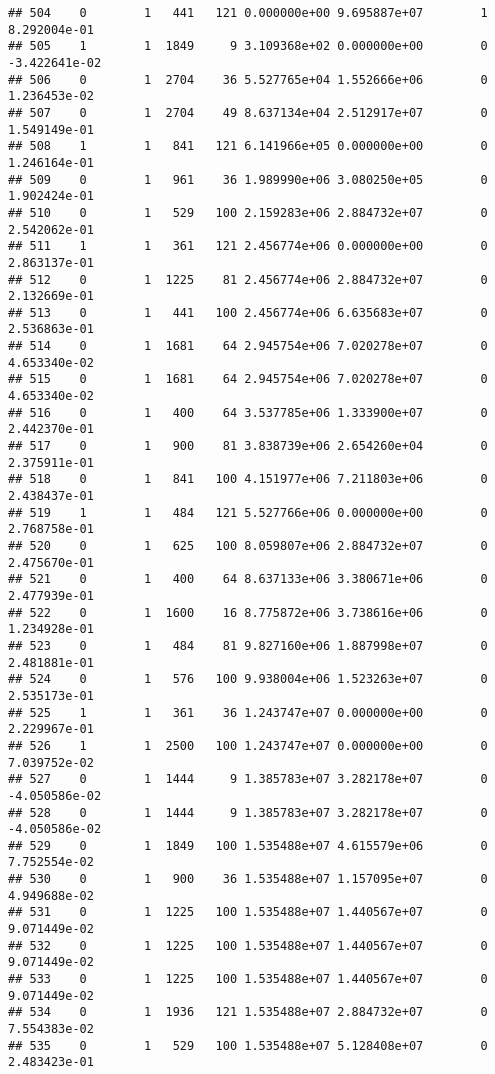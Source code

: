 \documentclass[
]{article}
\begin{document}
\begin{enumerate}
\begin{verbatim}
## 504    0        1   441   121 0.000000e+00 9.695887e+07        1  8.292004e-01
## 505    1        1  1849     9 3.109368e+02 0.000000e+00        0 -3.422641e-02
## 506    0        1  2704    36 5.527765e+04 1.552666e+06        0  1.236453e-02
## 507    0        1  2704    49 8.637134e+04 2.512917e+07        0  1.549149e-01
## 508    1        1   841   121 6.141966e+05 0.000000e+00        0  1.246164e-01
## 509    0        1   961    36 1.989990e+06 3.080250e+05        0  1.902424e-01
## 510    0        1   529   100 2.159283e+06 2.884732e+07        0  2.542062e-01
## 511    1        1   361   121 2.456774e+06 0.000000e+00        0  2.863137e-01
## 512    0        1  1225    81 2.456774e+06 2.884732e+07        0  2.132669e-01
## 513    0        1   441   100 2.456774e+06 6.635683e+07        0  2.536863e-01
## 514    0        1  1681    64 2.945754e+06 7.020278e+07        0  4.653340e-02
## 515    0        1  1681    64 2.945754e+06 7.020278e+07        0  4.653340e-02
## 516    0        1   400    64 3.537785e+06 1.333900e+07        0  2.442370e-01
## 517    0        1   900    81 3.838739e+06 2.654260e+04        0  2.375911e-01
## 518    0        1   841   100 4.151977e+06 7.211803e+06        0  2.438437e-01
## 519    1        1   484   121 5.527766e+06 0.000000e+00        0  2.768758e-01
## 520    0        1   625   100 8.059807e+06 2.884732e+07        0  2.475670e-01
## 521    0        1   400    64 8.637133e+06 3.380671e+06        0  2.477939e-01
## 522    0        1  1600    16 8.775872e+06 3.738616e+06        0  1.234928e-01
## 523    0        1   484    81 9.827160e+06 1.887998e+07        0  2.481881e-01
## 524    0        1   576   100 9.938004e+06 1.523263e+07        0  2.535173e-01
## 525    1        1   361    36 1.243747e+07 0.000000e+00        0  2.229967e-01
## 526    1        1  2500   100 1.243747e+07 0.000000e+00        0  7.039752e-02
## 527    0        1  1444     9 1.385783e+07 3.282178e+07        0 -4.050586e-02
## 528    0        1  1444     9 1.385783e+07 3.282178e+07        0 -4.050586e-02
## 529    0        1  1849   100 1.535488e+07 4.615579e+06        0  7.752554e-02
## 530    0        1   900    36 1.535488e+07 1.157095e+07        0  4.949688e-02
## 531    0        1  1225   100 1.535488e+07 1.440567e+07        0  9.071449e-02
## 532    0        1  1225   100 1.535488e+07 1.440567e+07        0  9.071449e-02
## 533    0        1  1225   100 1.535488e+07 1.440567e+07        0  9.071449e-02
## 534    0        1  1936   121 1.535488e+07 2.884732e+07        0  7.554383e-02
## 535    0        1   529   100 1.535488e+07 5.128408e+07        0  2.483423e-01

\end{verbatim}
\end{enumerate}
\end{document}

